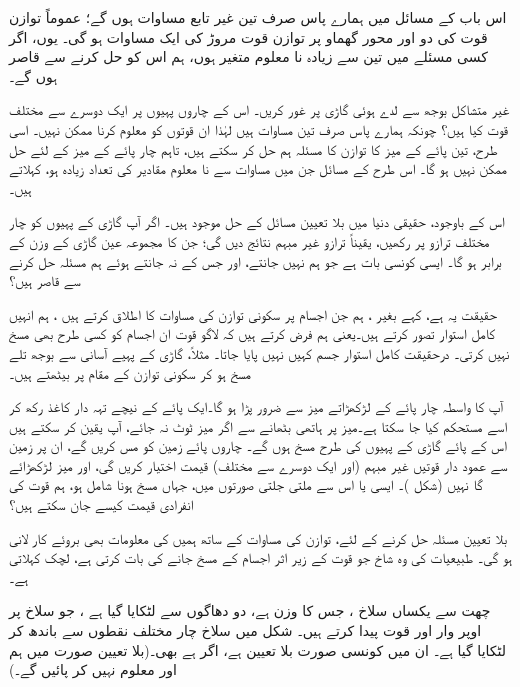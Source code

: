 اس باب کے مسائل  میں  ہمارے پاس صرف  تین غیر تابع مساوات  ہوں گے؛  عموماً  توازن قوت  کی  دو اور محور گھماو پر  توازن قوت مروڑ  کی  ایک مساوات ہو گی۔ یوں، اگر کسی مسئلے میں تین سے زیادہ نا معلوم متغیر ہوں، ہم اس کو حل کرنے سے قاصر ہوں گے۔

غیر  متشاکل بوجھ سے لدے ہوئی گاڑی پر غور کریں۔ اس کے چاروں پہیوں پر ایک دوسرے سے مختلف   قوت کیا ہیں؟ چونکہ ہمارے پاس صرف تین مساوات ہیں لہٰذا ان قوتوں کو معلوم کرنا ممکن نہیں۔ اسی طرح، تین پائے کے  میز  کا توازن کا مسئلہ  ہم حل کر سکتے ہیں، تاہم چار پائے کے میز کے لئے  حل ممکن نہیں ہو گا۔ اس طرح کے مسائل جن میں مساوات سے نا معلوم مقادیر  کی تعداد زیادہ ہو، کہلاتے ہیں۔

اس کے باوجود، حقیقی دنیا میں بلا تعیین مسائل کے حل موجود ہیں۔ اگر آپ گاڑی کے پہیوں کو چار مختلف ترازو پر رکھیں، یقیناً ترازو  غیر مبہم نتائج دیں گی؛ جن کا مجموعہ عین گاڑی کے وزن کے برابر ہو گا۔ ایسی کونسی بات ہے جو ہم نہیں جانتے، اور جس کے نہ جانتے ہوئے ہم مسئلہ حل کرنے سے قاصر ہیں؟

حقیقت یہ ہے، کہے بغیر ، ہم جن اجسام پر سکونی  توازن  کی مساوات کا اطلاق  کرتے ہیں ، ہم انہیں  کامل  استوار  تصور کرتے ہیں۔یعنی ہم فرض کرتے ہیں کہ لاگو قوت ان اجسام کو کسی طرح بھی  مسخ نہیں   کرتی۔ درحقیقت کامل استوار جسم کہیں نہیں پایا جاتا۔ مثلاً، گاڑی کے پہیے آسانی سے بوجھ تلے مسخ ہو کر  سکونی  توازن  کے مقام پر بیٹھتے ہیں۔

آپ کا واسطہ چار پائے کے لڑکھڑاتے  میز  سے ضرور پڑا ہو گا۔ایک پائے کے نیچے  تہہ دار کاغذ  رکھ کر اسے مستحکم کیا جا سکتا ہے۔میز پر  ہاتھی  بٹھانے سے اگر میز ٹوٹ نہ جائے، آپ یقین کر سکتے ہیں اس کے پائے گاڑی کے پہیوں کی طرح مسخ ہوں گے۔  چاروں پائے زمین کو مس کریں گے، ان پر زمین سے عمود دار قوتیں  غیر مبہم   (اور ایک دوسرے سے مختلف) قیمت اختیار کریں گی، اور  میز لڑکھڑائے گا نہیں (شکل )۔ ایسی  یا اس سے ملتی جلتی  صورتوں میں، جہاں  مسخ ہونا شامل ہو،  ہم  قوت  کی انفرادی قیمت کیسے جان سکتے ہیں؟

 بلا تعیین مسئلہ حل کرنے کے لئے، توازن کی مساوات کے ساتھ ہمیں  کی معلومات  بھی بروئے کار لانی ہو گی۔  طبیعیات کی وہ شاخ جو قوت کے زیر اثر اجسام کے مسخ جانے  کی بات کرتی ہے، لچک کہلاتی ہے۔
 
 چھت سے یکساں سلاخ ، جس کا وزن  ہے، دو  دھاگوں  سے لٹکایا گیا ہے ، جو سلاخ پر اوپر وار  اور  قوت  پیدا کرتے  ہیں۔ شکل  میں سلاخ  چار مختلف  نقطوں  سے باندھ کر لٹکایا گیا ہے۔ ان میں کونسی صورت  بلا تعیین ہے، اگر ہے بھی۔(بلا تعیین صورت 
 میں ہم  اور  معلوم نہیں کر پائیں گے۔)
 
